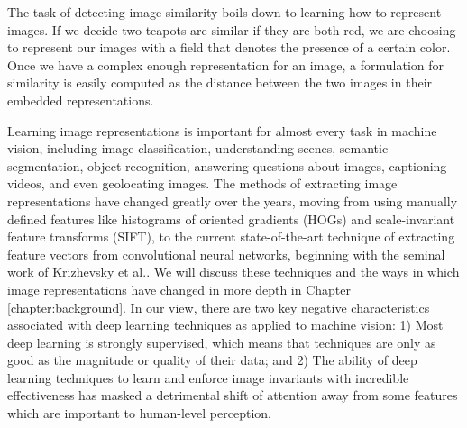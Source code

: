 The task of detecting image similarity boils down to learning how to represent images. If we decide two teapots are similar if they are both red, we are choosing to represent our images with a field that denotes the presence of a certain color. Once we have a complex enough representation for an image, a formulation for similarity is easily computed as the distance between the two images in their embedded representations.

Learning image representations is important for almost every task in machine vision, including image classification, understanding scenes, semantic segmentation, object recognition, answering questions about images, captioning videos, and even geolocating images. The methods of extracting image representations have changed greatly over the years, moving from using manually defined features like histograms of oriented gradients (HOGs)\cite{lowe1999object} and scale-invariant feature transforms (SIFT)\cite{dalal2005histograms}, to the current state-of-the-art technique of extracting feature vectors from convolutional neural networks, beginning with the seminal work of Krizhevsky et al.\cite{krizhevsky2012imagenet}. We will discuss these techniques and the ways in which image representations have changed in more depth in Chapter \ref{chapter:background}. In our view, there are two key negative characteristics associated with deep learning techniques as applied to machine vision: 1) Most deep learning is strongly supervised, which means that techniques are only as good as the magnitude or quality of their data; and 2) The ability of deep learning techniques to learn and enforce image invariants with incredible effectiveness has masked a detrimental shift of attention away from some features which are important to human-level perception.

